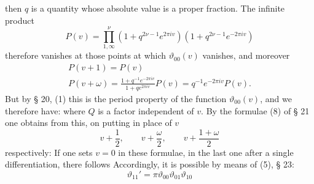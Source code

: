 then $q$ is a quantity whose absolute value is a proper fraction. The 
infinite product
\[
P(v) = \prod_{1,\infty}^{\nu} (1 + q^{2\nu-1}e^{2\pi i v})(1 + q^{2\nu-1}e^{-2\pi i v})
\]
therefore vanishes at  those points at which $\vartheta_{00}(v)$
vanishes, and moreover
\[
\begin{gathered}
P(v+1) = P(v)\\
P(v+\omega) = \frac{1+q^{-1}e^{-2\pi i v}}{1+qe^{2\pi i v}}P(v) = q^{-1}e^{-2\pi i v}P(v).
\end{gathered}
\]
But by § 20, (1) this is the period property of the function $\vartheta_{00}(v)$, and
we therefore have:
where $Q$ is a factor independent of $v$. By the formulae (8) of § 21 one obtains from
this, on putting in place of $v$
\[
v + \frac{1}{2}, \qquad v + \frac{\omega}{2}, \qquad v + \frac{1+\omega}{2}
\]
respectively:
If one sets $v = 0$ in these formulae, in the last one after a single differentiation,
there follows
Accordingly, it is possible by means of (5), § 23:
\[
\vartheta_{11}' = \pi\vartheta_{00}\vartheta_{01}\vartheta_{10}
\]
